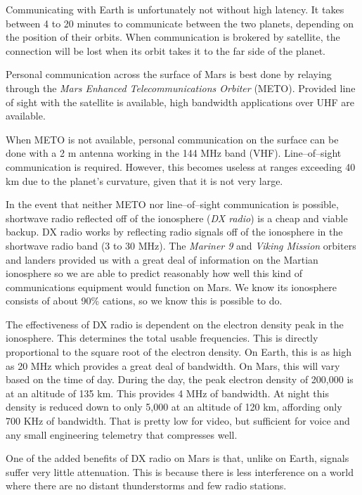 
Communicating with Earth is unfortunately not without high latency. It takes between 4 to 20 minutes to communicate between the two planets, depending on the position of their orbits. When communication is brokered by satellite, the connection will be lost when its orbit takes it to the far side of the planet.

Personal communication across the surface of Mars is best done by relaying through the {\it Mars Enhanced Telecommunications Orbiter} (METO). Provided line of sight with the satellite is available, high bandwidth applications over UHF are available.

When METO is not available, personal communication on the surface can be done with a 2 m antenna working in the 144 MHz band (VHF). Line--of--sight communication is required. However, this becomes useless at ranges exceeding 40 km due to the planet's curvature, given that it is not very large.

In the event that neither METO nor line--of--sight communication is possible, shortwave radio reflected off of the ionosphere ({\it DX radio}) is a cheap and viable backup. DX radio works by reflecting radio signals off of the ionosphere in the shortwave radio band (3 to 30 MHz). The {\it Mariner 9} and {\it Viking Mission} orbiters and landers provided us with a great deal of information on the Martian ionosphere so we are able to predict reasonably how well this kind of communications equipment would function on Mars. We know its ionosphere consists of about 90\%  cations, so we know this is possible to do.

The effectiveness of DX radio is dependent on the electron density peak in the ionosphere. This determines the total usable frequencies. This is directly proportional to the square root of the electron density. On Earth, this is as high as 20 MHz which provides a great deal of bandwidth. On Mars, this will vary based on the time of day. During the day, the peak electron density of 200,000  is at an altitude of 135 km. This provides 4 MHz of bandwidth. At night this density is reduced down to only 5,000  at an altitude of 120 km, affording only 700 KHz of bandwidth. That is pretty low for video, but sufficient for voice and any small engineering telemetry that compresses well.

One of the added benefits of DX radio on Mars is that, unlike on Earth, signals suffer very little attenuation. This is because there is less interference on a world where there are no distant thunderstorms and few radio stations.

